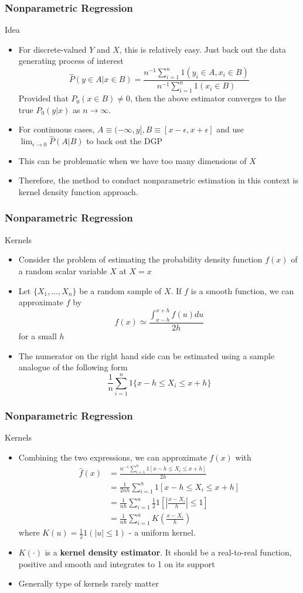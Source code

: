 \documentclass{beamer}
\begin{document}
\begin{frame}
\frametitle{Nonparametric Regression}
Idea
\begin{itemize}
\item For discrete-valued $Y$ and $X$, this is relatively easy. Just back out the data generating process of interest
\[
\hat{P}(y\in A| x\in B)=\frac{n^{-1}\sum_{i=1}^n1(y_i\in A, x_i\in B) }{n^{-1}\sum_{i=1}^n1(x_i\in B)}
\]
Provided that $P_0(x\in B)\neq 0$, then the above estimator converges to the true $P_0(y|x)$ as $n\to\infty$.
\item For continuous cases, $A\equiv (-\infty, y], B\equiv[x-\epsilon, x+\epsilon]$ and use $\lim_{\epsilon\to0}\hat{P}(A|B)$ to back out the DGP
\item  This can be problematic when we have too many dimensions of $X$
\item Therefore, the method to conduct nonparametric estimation in this context is kernel density function approach. 
\end{itemize}
\end{frame}

\begin{frame}
\frametitle{Nonparametric Regression}
Kernels
\begin{itemize}
\item Consider the problem of estimating the probability density function $f(x)$ of a random scalar variable $X$ at $X=x$
\item  Let $\{X_1,...,X_n\}$ be a random sample of $X$. If $f$ is a smooth function, we can approximate $f$ by
\[
f(x)\simeq \frac{\int_{x-h}^{x+h}f(u)du}{2h}
\]
for a small $h$
\item The numerator on the right hand side can be estimated using a sample analogue of the following form
\[
\frac{1}{n}\sum_{i=1}^n 1\{x-h\leq X_i \leq x+h \}
\]
\end{itemize}
\end{frame}

\begin{frame}
\frametitle{Nonparametric Regression}
Kernels
\begin{itemize}
\item Combining the two expressions, we can approximate $f(x)$ with
\footnotesize{\begin{align*}
\hat{f}(x)&=\frac{n^{-1}\sum_{i=1}^n 1[x-h\leq X_i \leq x+h]}{2h} \\
&=\frac{1}{2nh}\sum_{i=1}^n 1[x-h\leq X_i \leq x+h]\\
&=\frac{1}{nh}\sum_{i=1}^n \frac{1}{2}1\left[\left|\frac{x-X_i}{h}\right| \leq 1\right]\\
&=\frac{1}{nh}\sum_{i=1}^n K\left(\frac{x-X_i}{h}\right)
\end{align*}}\normalsize
where $K(u)=\frac{1}{2}1(|u|\leq 1)$ - a uniform kernel. 
\item $K(\cdot)$ is a \textbf{kernel density estimator}. It should be a real-to-real function, positive and smooth and integrates to 1 on its support
\item Generally type of kernels rarely matter
\end{itemize}
\end{frame}
\end{document}
